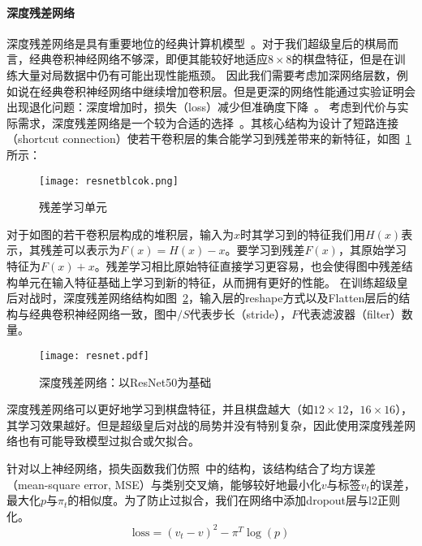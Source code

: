 \paragraph{深度残差网络}
深度残差网络是具有重要地位的经典计算机模型~\cite{resnet}。对于我们超级皇后的棋局而言，经典卷积神经网络不够深，即便其能较好地适应$8\times8$的棋盘特征，但是在训练大量对局数据中仍有可能出现性能瓶颈。
因此我们需要考虑加深网络层数，例如说在经典卷积神经网络中继续增加卷积层。但是更深的网络性能通过实验证明会出现退化问题：深度增加时，损失（loss）减少但准确度下降~\cite{resnet,he2016identity}。
考虑到代价与实际需求，深度残差网络是一个较为合适的选择~\cite{resnet}。其核心结构为设计了短路连接（shortcut connection）使若干卷积层的集合能学习到残差带来的新特征，如图~\ref{fig:resunit}所示：
\begin{figure}[H]
    \centering
    \texttt{[image: resnetblcok.png]}
    \caption[resunit]{%
    残差学习单元~\cite{resnet}%
      }
    \label{fig:resunit}
\end{figure}
对于如图的若干卷积层构成的堆积层，输入为$x$时其学习到的特征我们用$H(x)$表示，其残差可以表示为$F(x)=H(x)-x$。要学习到残差$F(x)$，其原始学习特征为$F(x)+x$。残差学习相比原始特征直接学习更容易，也会使得图中残差结构单元在输入特征基础上学习到新的特征，从而拥有更好的性能。
在训练超级皇后对战时，深度残差网络结构如图~\ref{fig:res}，输入层的reshape方式以及Flatten层后的结构与经典卷积神经网络一致，图中$/S$代表步长（stride），$F$代表滤波器（filter）数量。
\begin{figure}[H]
    \centering
    \texttt{[image: resnet.pdf]}
    \caption[res]{%
    深度残差网络：以ResNet50为基础~\cite{resnet}%
      }
    \label{fig:res}
\end{figure}
深度残差网络可以更好地学习到棋盘特征，并且棋盘越大（如$12\times12$，$16\times16$），其学习效果越好。但是超级皇后对战的局势并没有特别复杂，因此使用深度残差网络也有可能导致模型过拟合或欠拟合。

针对以上神经网络，损失函数我们仿照~\cite{Silver2017}中的结构，该结构结合了均方误差（mean-square error, MSE）与类别交叉熵，能够较好地最小化$v$与标签$v_{t}$的误差，最大化$p$与$\pi_{t}$的相似度。为了防止过拟合，我们在网络中添加dropout层与l2正则化。
\begin{equation}
    \text{loss} = (v_{t}-v)^{2} - \pi^{T}\log(p)
\end{equation}
